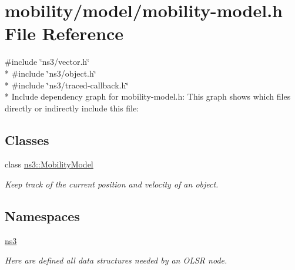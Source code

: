 \hypertarget{mobility-model_8h}{}\section{mobility/model/mobility-\/model.h File Reference}
\label{mobility-model_8h}
{\ttfamily \#include \char`\"{}ns3/vector.\+h\char`\"{}}\\*
{\ttfamily \#include \char`\"{}ns3/object.\+h\char`\"{}}\\*
{\ttfamily \#include \char`\"{}ns3/traced-\/callback.\+h\char`\"{}}\\*
Include dependency graph for mobility-\/model.h\+:
This graph shows which files directly or indirectly include this file\+:
\subsection*{Classes}
\begin{DoxyCompactItemize}
\item 
class \hyperlink{classns3_1_1MobilityModel}{ns3\+::\+Mobility\+Model}
\begin{DoxyCompactList}\small\item\em Keep track of the current position and velocity of an object. \end{DoxyCompactList}\end{DoxyCompactItemize}
\subsection*{Namespaces}
\begin{DoxyCompactItemize}
\item 
 \hyperlink{namespacens3}{ns3}
\begin{DoxyCompactList}\small\item\em Here are defined all data structures needed by an O\+L\+SR node. \end{DoxyCompactList}\end{DoxyCompactItemize}
